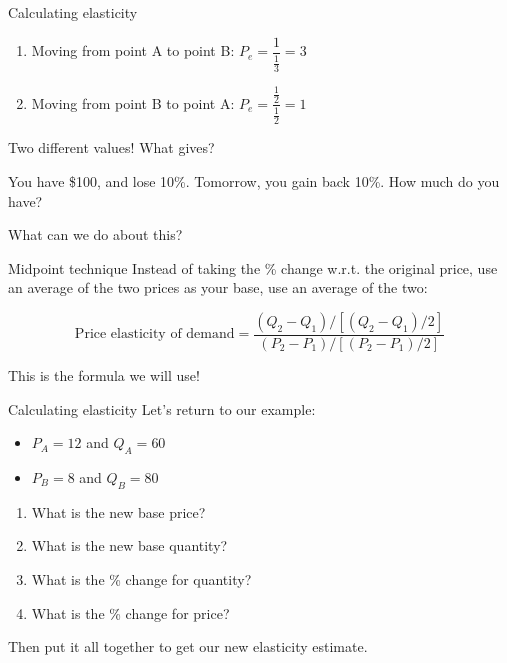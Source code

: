 \documentclass[aspectratio=169]{beamer}
\begin{document}
\begin{frame}{Calculating elasticity}
    
    \begin{enumerate}
    \item Moving from point A to point B: $P_e = \dfrac{1}{\frac{1}{3}} = 3$
    \item Moving from point B to point A: $P_e = \dfrac{\frac{1}{2}}{\frac{1}{2}} = 1$
    \end{enumerate}

    Two different values! What gives?

    \medskip

    You have \$100, and lose 10\%. Tomorrow, you gain back 10\%. How much do you have?

    \medskip

    What can we do about this?

\end{frame}

\begin{frame}{Midpoint technique}
Instead of taking the \% change w.r.t. the original price, use an average of the two prices as your base,  use an average of the two:

$$
\text{Price elasticity of demand} = \dfrac{(Q_2 - Q_1)/[(Q_2 - Q_1)/2]}{(P_2 - P_1)/[(P_2 - P_1)/2]}
$$

This is the formula we will use!

\end{frame}

\begin{frame}{Calculating elasticity}
    Let's return to our example:
    \begin{itemize}
        \item $P_A=12$ and $Q_A=60$
        \item $P_B=8$ and $Q_B=80$
    \end{itemize}
    
    \medskip

    \begin{enumerate}
        \item What is the new base price?
        \item What is the new base quantity?
        \item What is the \% change for quantity?
        \item What is the \% change for price?
    \end{enumerate}

    Then put it all together to get our new elasticity estimate.
\end{frame}
\end{document}
